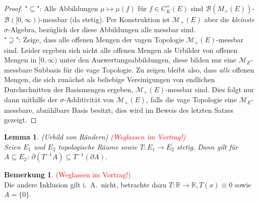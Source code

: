 \documentclass[twoside]{article}
\newtheorem{lemma}[theorem]{Lemma}
\theoremstyle{definition}
\newtheorem{remark}[theorem]{Bemerkung}
\begin{document}
\begin{proof}
"$\subseteq$": Alle Abbildungen $\mu \mapsto \mu(f)$ für $f \in C_K^+(E)$ sind $\mathcal{B}(M_+(E))$-$\mathcal{B}([0,\infty))$-messbar (da stetig). Per Konstruktion ist $\mathcal{M}_+(E)$ aber die \textit{kleinste} $\sigma$-Algebra, bezüglich der diese Abbildungen alle messbar sind.\\

"$\supseteq$": Zeige, dass alle offenen Mengen der vagen Topologie $\mathcal{M}_+(E)$-messbar sind. Leider ergeben sich nicht alle offenen Mengen als Urbilder von offenen Mengen in $[0, \infty)$ unter den Auswertungsabbildungen, diese bilden nur eine $\mathcal{M}_E$-messbare Subbasis für die vage Topologie. Zu zeigen bleibt also, dass \textit{alle} offenen Mengen, die sich zunächst als beliebige Vereinigungen von endlichen Durchschnitten der Basismengen ergeben, $\mathcal{M}_+(E)$-messbar sind. Dies folgt nur dann mithilfe der $\sigma$-Additivität von $\mathcal{M}_+(E)$, falls die vage Topologie eine $\mathcal{M}_E$-messbare, abzählbare Basis besitzt; dies wird im Beweis des letzten Satzes gezeigt.
\end{proof}
\begin{lemma}(Urbild von Rändern) \textcolor{red}{(Weglassen im Vortrag!)}\\
Seien $E_1$ und $E_2$ topologische Räume sowie $T:E_1 \to E_2$ stetig. Dann gilt für $A \subseteq E_2$: $\partial \left(T^{-1} A \right) \subseteq T^{-1} \left(\partial A \right)$.
\end{lemma}

\begin{remark} \textcolor{red}{(Weglassen im Vortrag!)}\\
Die andere Inklusion gilt i.\ A.\ nicht, betrachte dazu $T:\mathbb{R} \to \mathbb{R}, T(x) \equiv 0$ sowie $A = \{0\}$.
\end{remark}
\end{document}
